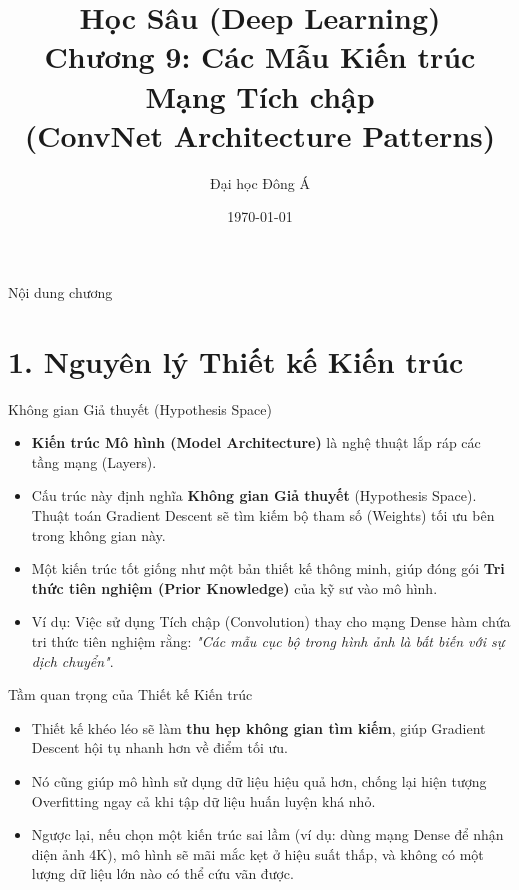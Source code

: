 \documentclass[aspectratio=169]{beamer}
\title[Chương 9: Kiến trúc ConvNet]{Học Sâu (Deep Learning) \\ \vspace{0.5cm} \Large Chương 9: Các Mẫu Kiến trúc Mạng Tích chập \\ (ConvNet Architecture Patterns)}
\author{Đại học Đông Á}
\date{\today}
\begin{document}
\begin{frame}
    \titlepage
\end{frame}

\begin{frame}{Nội dung chương}
    \tableofcontents
\end{frame}

\section{1. Nguyên lý Thiết kế Kiến trúc}

\begin{frame}{Không gian Giả thuyết (Hypothesis Space)}
    \begin{itemize}
        \item \textbf{Kiến trúc Mô hình (Model Architecture)} là nghệ thuật lắp ráp các tầng mạng (Layers).
        \item Cấu trúc này định nghĩa \textbf{Không gian Giả thuyết} (Hypothesis Space). Thuật toán Gradient Descent sẽ tìm kiếm bộ tham số (Weights) tối ưu bên trong không gian này.
        \item Một kiến trúc tốt giống như một bản thiết kế thông minh, giúp đóng gói \textbf{Tri thức tiên nghiệm (Prior Knowledge)} của kỹ sư vào mô hình.
        \item Ví dụ: Việc sử dụng Tích chập (Convolution) thay cho mạng Dense hàm chứa tri thức tiên nghiệm rằng: \textit{"Các mẫu cục bộ trong hình ảnh là bất biến với sự dịch chuyển"}.
    \end{itemize}
\end{frame}

\begin{frame}{Tầm quan trọng của Thiết kế Kiến trúc}
    \begin{itemize}
        \item Thiết kế khéo léo sẽ làm \textbf{thu hẹp không gian tìm kiếm}, giúp Gradient Descent hội tụ nhanh hơn về điểm tối ưu.
        \item Nó cũng giúp mô hình sử dụng dữ liệu hiệu quả hơn, chống lại hiện tượng Overfitting ngay cả khi tập dữ liệu huấn luyện khá nhỏ.
        \item Ngược lại, nếu chọn một kiến trúc sai lầm (ví dụ: dùng mạng Dense để nhận diện ảnh 4K), mô hình sẽ mãi mắc kẹt ở hiệu suất thấp, và không có một lượng dữ liệu lớn nào có thể cứu vãn được.
    \end{itemize}
\end{frame}
\end{document}
